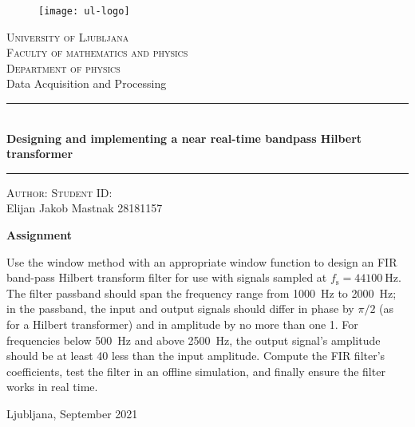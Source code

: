 \thispagestyle{empty}
\begin{center}

    \begin{figure}[htb!]
        \centering
        \texttt{[image: ul-logo]}
    \end{figure}
    \LARGE{\textsc{University of Ljubljana}}\\
    \Large{\textsc{Faculty of {\color{ul-red} mathematics and physics}}}\\[1ex]
    \large{\textsc{Department of physics}}\\
    \vspace{5ex}
    \huge{Data Acquisition and Processing}\\
    \rule{0.9\textwidth}{0.2pt}\\[1ex] \LARGE{\textbf{Designing and implementing a near real-time bandpass Hilbert transformer}}
    \rule{0.9\textwidth}{0.2pt}

    \vspace{1ex}

    \begin{minipage}[t]{0.80\textwidth}
        \normalsize{\textsc{Author:}} \hfill \large{\textsc{Student ID}:}\\
    \large{Elijan Jakob Mastnak} \hfill \large{28181157}
    \end{minipage}

\end{center}

\vspace{5ex}
\begin{center}
    \textbf{Assignment}\\[2mm]
    \begin{minipage}[t]{0.80\textwidth}
        Use the window method with an appropriate window function to design an FIR band-pass Hilbert transform filter for use with signals sampled at $ f_{\mathrm{s}} = \SI{44100}{\hertz} $.
        The filter passband should span the frequency range from \SI{1000}{\hertz} to \SI{2000}{\hertz}; in the passband, the input and output signals should differ in phase by $ \pi/2 $ (as for a Hilbert transformer) and in amplitude by no more than one \SI{1}{\decibell}.
        For frequencies below \SI{500}{\hertz} and above \SI{2500}{\hertz}, the output signal's amplitude should be at least \SI{40}{\decibell} less than the input amplitude.
        Compute the FIR filter's coefficients, test the filter in an offline simulation, and finally ensure the filter works in real time.
        
    \end{minipage}

    \vfill
    \large{Ljubljana, September 2021}
\end{center}
